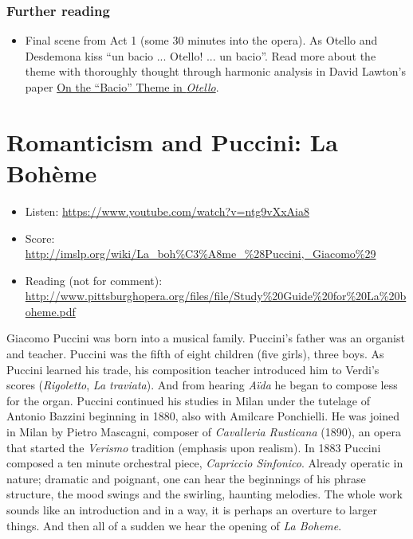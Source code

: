 \subsubsection{Further reading}
\begin{itemize}
\item Final scene from Act 1 (some 30 minutes into the opera). As Otello and Desdemona kiss ``un bacio ... Otello! ... un bacio''. Read more about the theme with thoroughly thought through harmonic analysis in David Lawton's paper \href{http://www.jstor.org/stable/746411?seq=1#page_scan_tab_contents}{On the ``Bacio'' Theme in \textit{Otello}}. 
\end{itemize}

\section{Romanticism and Puccini: La Boh\`eme}
\begin{itemize}
\item Listen: \url{https://www.youtube.com/watch?v=ntg9vXxAia8}
\item Score: \url{http://imslp.org/wiki/La_boh%C3%A8me_%28Puccini,_Giacomo%29}
\item Reading (not for comment): \url{http://www.pittsburghopera.org/files/file/Study%20Guide%20for%20La%20boheme.pdf}
\end{itemize}

Giacomo Puccini was born into a musical family. Puccini's father was an organist and teacher. Puccini was the fifth of eight children (five girls), three boys. As Puccini learned his trade, his composition teacher introduced him to Verdi's scores (\textit{Rigoletto}, \textit{La traviata}). And from hearing \textit{A\"ida} he began to compose less for the organ. Puccini continued his studies in Milan under the tutelage of Antonio Bazzini beginning in 1880, also with Amilcare Ponchielli. He was joined in Milan by Pietro Mascagni, composer of \textit{Cavalleria Rusticana} (1890), an opera that started the \textit{Verismo} tradition (emphasis upon realism). In 1883 Puccini composed a ten minute orchestral piece, \textit{Capriccio Sinfonico}. Already operatic in nature; dramatic and poignant, one  can hear the beginnings of his phrase structure, the mood swings and the swirling, haunting melodies. The whole work sounds like an introduction and in a way, it is perhaps an overture to larger things. And then all of a sudden we hear the opening of \textit{La Boheme}. 

